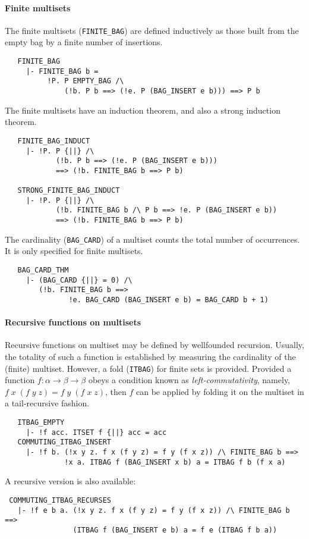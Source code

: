 \paragraph {Finite multisets}

The finite multisets ({\small\verb+FINITE_BAG+}) are defined inductively as those
built from the empty bag by a finite number of insertions.
%
{\small
\begin{verbatim}
   FINITE_BAG
     |- FINITE_BAG b =
          !P. P EMPTY_BAG /\
              (!b. P b ==> (!e. P (BAG_INSERT e b))) ==> P b
\end{verbatim}
}
%
\noindent The finite multisets have an induction theorem, and also a strong
induction theorem.
%
{\small
\begin{verbatim}
   FINITE_BAG_INDUCT
     |- !P. P {||} /\
            (!b. P b ==> (!e. P (BAG_INSERT e b)))
            ==> (!b. FINITE_BAG b ==> P b)

   STRONG_FINITE_BAG_INDUCT
     |- !P. P {||} /\
            (!b. FINITE_BAG b /\ P b ==> !e. P (BAG_INSERT e b))
            ==> (!b. FINITE_BAG b ==> P b)
\end{verbatim}
}
%
The cardinality ({\small\verb+BAG_CARD+}) of a multiset counts the
total number of occurrences. It is only specified for finite multisets.
%
{\small
\begin{verbatim}
   BAG_CARD_THM
     |- (BAG_CARD {||} = 0) /\
        (!b. FINITE_BAG b ==>
               !e. BAG_CARD (BAG_INSERT e b) = BAG_CARD b + 1)
\end{verbatim}
}

\paragraph{Recursive functions on multisets}

Recursive functions on multiset may be defined by wellfounded
recursion. Usually, the totality of such a function is established by
measuring the cardinality of the (finite) multiset. However,
a fold ({\small\verb+ITBAG+}) for finite sets is provided.
Provided a function $f:\alpha\to\beta\to\beta$ obeys a condition
known as \emph{left-commutativity}, namely, $f\;x\;(f\;y\;z) =
f\;y\;(f\;x\;z)$, then $f$ can be applied by folding it on the multiset
in a tail-recursive fashion.
%
{\small
\begin{verbatim}
   ITBAG_EMPTY
     |- !f acc. ITSET f {||} acc = acc
   COMMUTING_ITBAG_INSERT
     |- !f b. (!x y z. f x (f y z) = f y (f x z)) /\ FINITE_BAG b ==>
              !x a. ITBAG f (BAG_INSERT x b) a = ITBAG f b (f x a)
\end{verbatim}
}
%
\noindent A recursive version is also available:
{\small
\begin{verbatim}
 COMMUTING_ITBAG_RECURSES
   |- !f e b a. (!x y z. f x (f y z) = f y (f x z)) /\ FINITE_BAG b ==>
                (ITBAG f (BAG_INSERT e b) a = f e (ITBAG f b a))
\end{verbatim}
}

